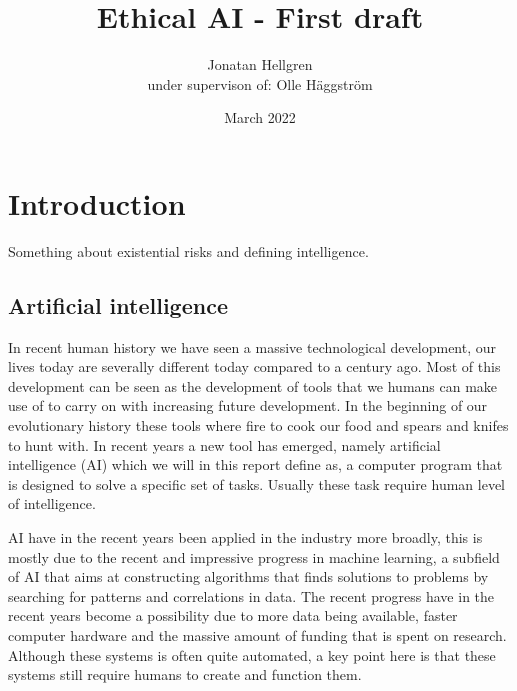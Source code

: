 \documentclass[12pt,A4]{report}
\title{Ethical AI - First draft}
\author{Jonatan Hellgren\\
under supervison of: Olle Häggström}
\date{March 2022}
\theoremstyle{definition}
\begin{document}
\maketitle


\thispagestyle{empty}

\newpage


\chapter{Introduction}
Something about existential risks and defining intelligence. 

\section{Artificial intelligence}

In recent human history we have seen a massive technological development, our lives today are severally different today compared to a century ago. Most of this development can be seen as the development of tools that we humans can make use of to carry on with increasing future development. In the beginning of our evolutionary history these tools where fire to cook our food and spears and knifes to hunt with. In recent years a new tool has emerged, namely artificial intelligence (AI) which we will in this report define as, a computer program that is designed to solve a specific set of tasks. Usually these task require human level of intelligence.

AI have in the recent years been applied in the industry more broadly, this is mostly due to the recent and impressive progress in machine learning, a subfield of AI that aims at constructing algorithms that finds solutions to problems by searching for patterns and correlations in data. The recent progress have in the recent years become a possibility due to more data being available, faster computer hardware and the massive amount of funding that is spent on research. Although these systems is often quite automated, a key point here is that these systems still require humans to create and function them.
\end{document}
